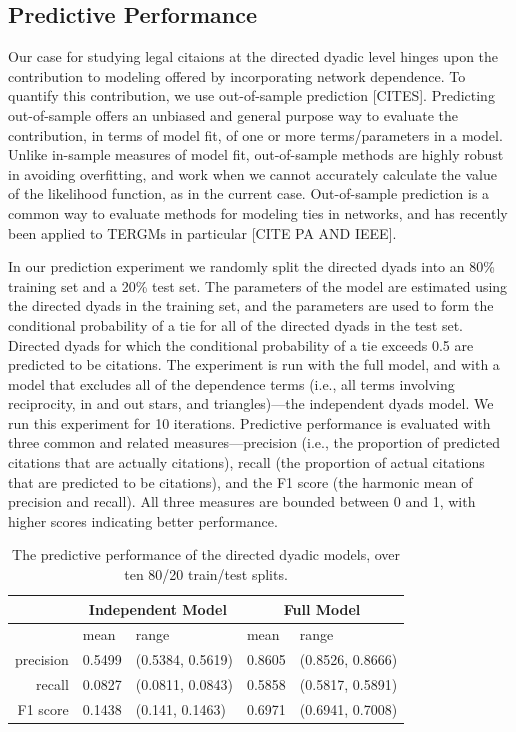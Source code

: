 \documentclass[headsepline=true, abstracton]{scrartcl}
\begin{document}
\subsection{Predictive Performance}

Our case for studying legal citaions at the directed dyadic level hinges upon the contribution to modeling offered by incorporating network dependence. To quantify this contribution, we use out-of-sample prediction [CITES]. Predicting out-of-sample offers an unbiased and general purpose way to evaluate the contribution, in terms of model fit, of one or more terms/parameters in a model. Unlike in-sample measures of model fit, out-of-sample methods are highly robust in avoiding overfitting, and work when we cannot accurately calculate the value of the likelihood function, as in the current case. Out-of-sample prediction is a common way to evaluate methods for modeling ties in networks, and has recently been applied to TERGMs in particular [CITE PA AND IEEE].

In our prediction experiment we randomly split the directed dyads into an 80\% training set and a 20\% test set. The parameters of the model are estimated using the directed dyads in the training set, and the parameters are used to form the conditional probability of a tie for all of the directed dyads in the test set. Directed dyads for which the conditional probability of a tie exceeds 0.5 are predicted to be citations. The experiment is run with the full model, and with a model that excludes all of the dependence terms (i.e., all terms involving reciprocity, in and out stars, and triangles)---the independent dyads model. We run this experiment for 10 iterations. Predictive performance is evaluated with three common and related measures---precision (i.e., the proportion of predicted citations that are actually citations), recall (the proportion of actual citations that are predicted to be citations), and the F1 score (the harmonic mean of precision and recall). All three measures are bounded between 0 and 1, with higher scores indicating better performance.

\begin{table}[ht]
\centering
\begin{tabular}{rllll}
\hline \hline
& \multicolumn{2}{c}{Independent Model} & \multicolumn{2}{c}{Full Model} \\
  \hline
 & mean & range & mean & range \\ 
  \hline
precision & 0.5499 & (0.5384, 0.5619) & 0.8605 & (0.8526, 0.8666) \\ 
  recall & 0.0827 & (0.0811, 0.0843) & 0.5858 & (0.5817, 0.5891) \\ 
  F1 score & 0.1438 & (0.141, 0.1463) & 0.6971 & (0.6941, 0.7008) \\ 
   \hline \hline
\end{tabular}
\caption{The predictive performance of the directed dyadic models, over ten 80/20 train/test splits.}
\label{tab:prediction}
\end{table}
\end{document}
